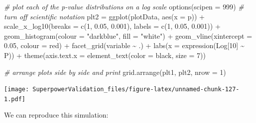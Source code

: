 \documentclass[
]{book}
\newenvironment{Shaded}{\begin{snugshade}}{\end{snugshade}}
\newcommand{\AttributeTok}[1]{\textcolor[rgb]{0.77,0.63,0.00}{#1}}
\newcommand{\CommentTok}[1]{\textcolor[rgb]{0.56,0.35,0.01}{\textit{#1}}}
\newcommand{\DecValTok}[1]{\textcolor[rgb]{0.00,0.00,0.81}{#1}}
\newcommand{\FloatTok}[1]{\textcolor[rgb]{0.00,0.00,0.81}{#1}}
\newcommand{\FunctionTok}[1]{\textcolor[rgb]{0.00,0.00,0.00}{#1}}
\newcommand{\NormalTok}[1]{#1}
\newcommand{\OtherTok}[1]{\textcolor[rgb]{0.56,0.35,0.01}{#1}}
\newcommand{\SpecialCharTok}[1]{\textcolor[rgb]{0.00,0.00,0.00}{#1}}
\newcommand{\StringTok}[1]{\textcolor[rgb]{0.31,0.60,0.02}{#1}}
\begin{document}
\begin{Shaded}
\begin{Highlighting}[]
\CommentTok{\# plot each of the p{-}value distributions on a log scale}
\FunctionTok{options}\NormalTok{(}\AttributeTok{scipen =} \DecValTok{999}\NormalTok{) }\CommentTok{\# \textquotesingle{}turn off\textquotesingle{} scientific notation}
\NormalTok{plt2 }\OtherTok{=} \FunctionTok{ggplot}\NormalTok{(plotData, }\FunctionTok{aes}\NormalTok{(}\AttributeTok{x =}\NormalTok{ p)) }\SpecialCharTok{+}
\FunctionTok{scale\_x\_log10}\NormalTok{(}\AttributeTok{breaks =} \FunctionTok{c}\NormalTok{(}\DecValTok{1}\NormalTok{, }\FloatTok{0.05}\NormalTok{, }\FloatTok{0.001}\NormalTok{),}
\AttributeTok{labels =} \FunctionTok{c}\NormalTok{(}\DecValTok{1}\NormalTok{, }\FloatTok{0.05}\NormalTok{, }\FloatTok{0.001}\NormalTok{)) }\SpecialCharTok{+}
\FunctionTok{geom\_histogram}\NormalTok{(}\AttributeTok{colour =} \StringTok{"darkblue"}\NormalTok{, }\AttributeTok{fill =} \StringTok{"white"}\NormalTok{) }\SpecialCharTok{+}
\FunctionTok{geom\_vline}\NormalTok{(}\AttributeTok{xintercept =} \FloatTok{0.05}\NormalTok{, }\AttributeTok{colour =} \StringTok{\textquotesingle{}red\textquotesingle{}}\NormalTok{) }\SpecialCharTok{+}
\FunctionTok{facet\_grid}\NormalTok{(variable }\SpecialCharTok{\textasciitilde{}}\NormalTok{ .) }\SpecialCharTok{+}
\FunctionTok{labs}\NormalTok{(}\AttributeTok{x =} \FunctionTok{expression}\NormalTok{(Log[}\DecValTok{10}\NormalTok{] }\SpecialCharTok{\textasciitilde{}}\NormalTok{ P)) }\SpecialCharTok{+}
\FunctionTok{theme}\NormalTok{(}\AttributeTok{axis.text.x =} \FunctionTok{element\_text}\NormalTok{(}\AttributeTok{color =} \StringTok{\textquotesingle{}black\textquotesingle{}}\NormalTok{, }\AttributeTok{size =} \DecValTok{7}\NormalTok{))}

\CommentTok{\# arrange plots side by side and print}
\FunctionTok{grid.arrange}\NormalTok{(plt1, plt2, }\AttributeTok{nrow =} \DecValTok{1}\NormalTok{)}
\end{Highlighting}
\end{Shaded}

\texttt{[image: SuperpowerValidation\_files/figure-latex/unnamed-chunk-127-1.pdf]}

We can reproduce this simulation:
\end{document}
